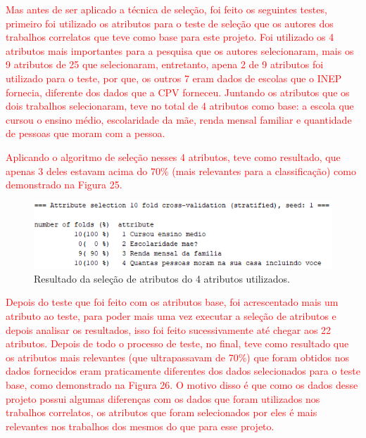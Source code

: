 \par
\textcolor{red}{}



\par
\textcolor{red}{Mas antes de ser aplicado a técnica de seleção, foi feito os seguintes testes, primeiro foi utilizado os atributos para o teste de seleção que os autores dos trabalhos correlatos que teve como base para este projeto. Foi utilizado os 4 atributos mais importantes para a pesquisa que os autores  selecionaram, mais os 9 atributos de 25 que  selecionaram, entretanto, apena 2 de 9 atributos foi utilizado para o teste, por que, os outros 7 eram dados de escolas que o INEP fornecia, diferente dos dados que a CPV forneceu. Juntando os atributos que os dois trabalhos selecionaram, teve no total de 4 atributos como base: a escola que cursou o ensino médio, escolaridade da mãe, renda mensal familiar e quantidade de pessoas que moram com a pessoa.}

\par\textcolor{red}{Aplicando o algoritmo de seleção nesses 4 atributos, teve como resultado, que apenas 3 deles estavam acima do 70\%  (mais relevantes para a classificação) como demonstrado na Figura 25.}

\par
\begin{figure}[!htp]
	\begin{center}
    \caption{\label{fig:waveform_fig} Resultado da seleção de atributos do 4 atributos utilizados.}
	\includegraphics[scale=0.99]{Figuras/4_atributos.png}
	\end{center}
\end{figure}

\par
\textcolor{red}{Depois do teste que foi feito com os atributos base, foi acrescentado mais um atributo ao teste, para poder mais uma vez executar a seleção de atributos e depois analisar os resultados, isso foi feito sucessivamente até chegar aos 22 atributos. Depois de todo o processo de teste, no final, teve como resultado que os atributos mais relevantes (que ultrapassavam de 70\%) que foram obtidos nos dados fornecidos eram praticamente diferentes dos dados selecionados para o teste base, como demonstrado na Figura 26. O motivo disso é que  como os dados desse projeto possui algumas diferenças com os dados que foram utilizados nos trabalhos correlatos, os atributos que foram selecionados por eles é mais relevantes nos trabalhos dos mesmos do que para esse projeto.}

